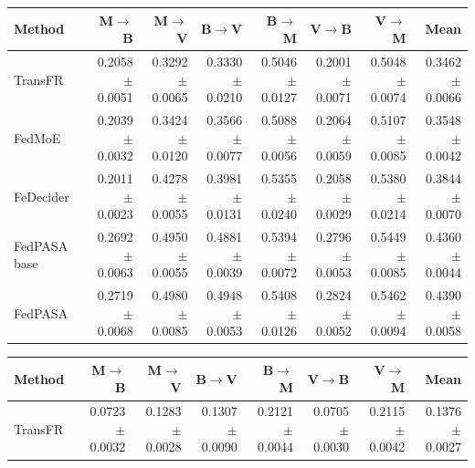 {%
\par\noindent\begin{minipage}{\textwidth}\centering\footnotesize
{}\label{tab:seed-hr}
\setlength{\tabcolsep}{2.5pt}
\begin{tabular*}{\linewidth}{@{\extracolsep{\fill}}lrrrrrrr@{}}
\toprule
Method & M$\to$B & M$\to$V & B$\to$V & B$\to$M & V$\to$B & V$\to$M & Mean \\
\midrule
TransFR~\citep{zhang2026transfr} & 0.2058$\pm$0.0051 & 0.3292$\pm$0.0065 & 0.3330$\pm$0.0210 & 0.5046$\pm$0.0127 & 0.2001$\pm$0.0071 & 0.5048$\pm$0.0074 & 0.3462$\pm$0.0066 \\
FedMoE~\citep{mei2024fedmoe} & 0.2039$\pm$0.0032 & 0.3424$\pm$0.0120 & 0.3566$\pm$0.0077 & 0.5088$\pm$0.0056 & 0.2064$\pm$0.0059 & 0.5107$\pm$0.0085 & 0.3548$\pm$0.0042 \\
FeDecider~\citep{he2026fedecider} & 0.2011$\pm$0.0023 & 0.4278$\pm$0.0055 & 0.3981$\pm$0.0131 & 0.5355$\pm$0.0240 & 0.2058$\pm$0.0029 & 0.5380$\pm$0.0214 & 0.3844$\pm$0.0070 \\
FedPASA base & 0.2692$\pm$0.0063 & 0.4950$\pm$0.0055 & 0.4881$\pm$0.0039 & 0.5394$\pm$0.0072 & 0.2796$\pm$0.0053 & 0.5449$\pm$0.0085 & 0.4360$\pm$0.0044 \\
FedPASA & 0.2719$\pm$0.0068 & 0.4980$\pm$0.0085 & 0.4948$\pm$0.0053 & 0.5408$\pm$0.0126 & 0.2824$\pm$0.0052 & 0.5462$\pm$0.0094 & 0.4390$\pm$0.0058 \\
\bottomrule
\end{tabular*}
\end{minipage}\par\addvspace{6pt}
\par\noindent\begin{minipage}{\textwidth}\centering\footnotesize
{}\label{tab:seed-ndcg}
\setlength{\tabcolsep}{2.5pt}
\begin{tabular*}{\linewidth}{@{\extracolsep{\fill}}lrrrrrrr@{}}
\toprule
Method & M$\to$B & M$\to$V & B$\to$V & B$\to$M & V$\to$B & V$\to$M & Mean \\
\midrule
TransFR~\citep{zhang2026transfr} & 0.0723$\pm$0.0032 & 0.1283$\pm$0.0028 & 0.1307$\pm$0.0090 & 0.2121$\pm$0.0044 & 0.0705$\pm$0.0030 & 0.2115$\pm$0.0042 & 0.1376$\pm$0.0027 \\

\end{tabular*}
\end{minipage}}
